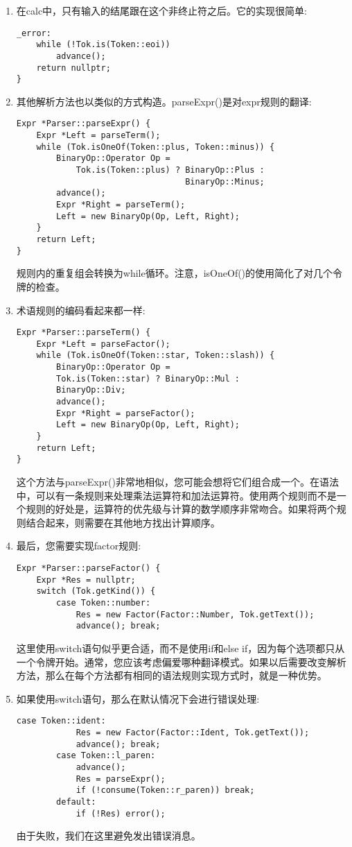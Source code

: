 \begin{enumerate}
\item 在calc中，只有输入的结尾跟在这个非终止符之后。它的实现很简单:
\begin{lstlisting}[caption={}]
_error:
	while (!Tok.is(Token::eoi))
		advance();
	return nullptr;
}
\end{lstlisting}

\item 其他解析方法也以类似的方式构造。parseExpr()是对expr规则的翻译:
\begin{lstlisting}[caption={}]
Expr *Parser::parseExpr() {
	Expr *Left = parseTerm();
	while (Tok.isOneOf(Token::plus, Token::minus)) {
		BinaryOp::Operator Op =
			Tok.is(Token::plus) ? BinaryOp::Plus :
								  BinaryOp::Minus;
		advance();
		Expr *Right = parseTerm();
		Left = new BinaryOp(Op, Left, Right);
	}
	return Left;
}
\end{lstlisting}
规则内的重复组会转换为while循环。注意，isOneOf()的使用简化了对几个令牌的检查。

\item 术语规则的编码看起来都一样:
\begin{lstlisting}[caption={}]
Expr *Parser::parseTerm() {
	Expr *Left = parseFactor();
	while (Tok.isOneOf(Token::star, Token::slash)) {
		BinaryOp::Operator Op =
		Tok.is(Token::star) ? BinaryOp::Mul :
		BinaryOp::Div;
		advance();
		Expr *Right = parseFactor();
		Left = new BinaryOp(Op, Left, Right);
	}
	return Left;
}
\end{lstlisting}
这个方法与parseExpr()非常地相似，您可能会想将它们组合成一个。在语法中，可以有一条规则来处理乘法运算符和加法运算符。使用两个规则而不是一个规则的好处是，运算符的优先级与计算的数学顺序非常吻合。如果将两个规则结合起来，则需要在其他地方找出计算顺序。

\item 最后，您需要实现factor规则:
\begin{lstlisting}[caption={}]
Expr *Parser::parseFactor() {
	Expr *Res = nullptr;
	switch (Tok.getKind()) {
		case Token::number:
			Res = new Factor(Factor::Number, Tok.getText());
			advance(); break;
\end{lstlisting}
这里使用switch语句似乎更合适，而不是使用if和else if，因为每个选项都只从一个令牌开始。通常，您应该考虑偏爱哪种翻译模式。如果以后需要改变解析方法，那么在每个方法都有相同的语法规则实现方式时，就是一种优势。

\item 如果使用switch语句，那么在默认情况下会进行错误处理:
\begin{lstlisting}[caption={}]
		case Token::ident:
			Res = new Factor(Factor::Ident, Tok.getText());
			advance(); break;
		case Token::l_paren:
			advance();
			Res = parseExpr();
			if (!consume(Token::r_paren)) break;
		default:
			if (!Res) error();
\end{lstlisting}
由于失败，我们在这里避免发出错误消息。


\end{enumerate}
